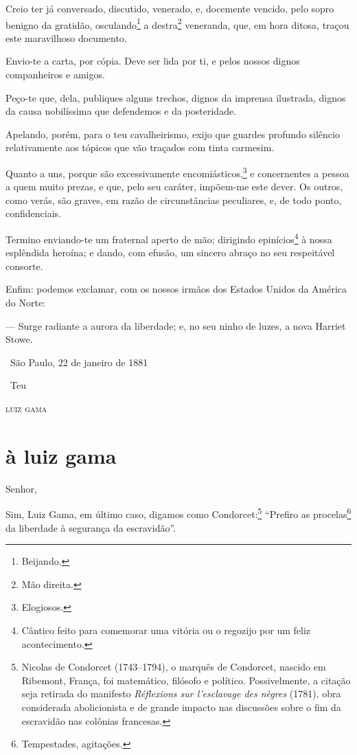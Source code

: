 Creio ter já conversado, discutido, venerado, e, docemente vencido, pelo
sopro benigno da gratidão, osculando\footnote{Beijando.} a
destra\footnote{Mão direita.} veneranda, que, em hora ditosa, traçou
este maravilhoso documento.

Envio-te a carta, por cópia. Deve ser lida por ti, e pelos nossos dignos
companheiros e amigos.

Peço-te que, dela, publiques alguns trechos, dignos da imprensa
ilustrada, dignos da causa nobilíssima que defendemos e da posteridade.

Apelando, porém, para o teu cavalheirismo, exijo que guardes profundo
silêncio relativamente aos tópicos que vão traçados com tinta carmesim.

Quanto a uns, porque são excessivamente encomiásticos,\footnote{
  Elogiosos.} e concernentes a pessoa a quem muito prezas, e que, pelo
seu caráter, impõem-me este dever. Os outros, como verás, são graves, em
razão de circunstâncias peculiares, e, de todo ponto, confidenciais.

Termino enviando-te um fraternal aperto de mão; dirigindo
epinícios\footnote{Cântico feito para comemorar uma vitória ou o
  regozijo por um feliz acontecimento.} à nossa esplêndida heroína; e
dando, com efusão, um sincero abraço no seu respeitável consorte.

Enfim: podemos exclamar, com os nossos irmãos dos Estados Unidos da
América do Norte:

--- Surge radiante a aurora da liberdade; e, no seu ninho de luzes, a
nova Harriet Stowe.\medskip

\hfill\ São Paulo, 22 de janeiro de 1881

\hfill\ Teu

\hfill\textsc{luiz gama}

\asterisc

\section*{à luiz gama}

\noindent{}Senhor,%


Sim, Luiz Gama, em último caso, digamos como Condorcet:\footnote{
  Nicolas de Condorcet (1743--1794), o marquês de Condorcet, nascido em
  Ribemont, França, foi matemático, filósofo e político. Possivelmente,
  a citação seja retirada do manifesto \emph{Réflexions sur l'esclavage des nègres} (1781), obra considerada abolicionista e de grande impacto
  nas discussões sobre o fim da escravidão nas colônias francesas.}
``Prefiro as procelas\footnote{Tempestades, agitações.} da liberdade à
segurança da escravidão''.


